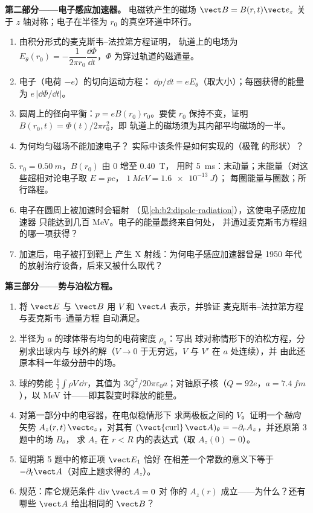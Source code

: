 \begin{problem}
\medskip
\noindent\textbf{第二部分——电子感应加速器。}
电磁铁产生的磁场 $\vect B = B(r, t)\vect e_z$ 关于
$z$ 轴对称；电子在半径为 $r_0$ 的真空环道中环行。
\begin{enumerate}[resume]
  \item 由积分形式的麦克斯韦–法拉第方程证明，
        轨道上的电场为 $E_\theta(r_0) = -\dfrac1{2\pi r_0}
        \dfrac{\dd\Phi}{\dd t}$，$\Phi$ 为穿过轨道的磁通量。
  \item 电子（电荷 $-e$）的切向运动方程：
        $\dd p/\dd t = eE_\theta$（取大小）；每圈获得的能量为
        $e\,|\dd\Phi/\dd t|$。
  \item 圆周上的径向平衡：$p = eB(r_0)r_0$。要使 $r_0$
        保持不变，证明 $B(r_0, t) = \Phi(t)/2\pi r_0^2$，即
        轨道上的磁场须为其内部平均磁场的一半。
  \item 为何均匀磁场不能加速电子？
        实际中该条件是如何实现的（极靴
        的形状）？
  \item $r_0 = \qty{0.50}{m}$，$B(r_0)$ 由 $0$ 增至 \qty{0.40}{T}，
        用时 \qty{5}{ms}：末动量；末能量（对这些超相对论电子取 $E = pc$，
        $\qty{1}{MeV} = \qty{1.6e-13}{J}$）；
        每圈能量与圈数；所行路程。
  \item 电子在圆周上被加速时会辐射
        （见\cref{ch:b2:dipole-radiation}），这使电子感应加速器
        只能达到几百 MeV。电子的能量最终来自何处，
        并通过麦克斯韦方程组的哪一项获得？
  \item 加速后，电子被打到靶上
        产生 X 射线：为何电子感应加速器曾是
        1950 年代的放射治疗设备，后来又被什么取代？
\end{enumerate}

\medskip
\noindent\textbf{第三部分——势与泊松方程。}
\begin{enumerate}[resume]
  \item 将 $\vect E$ 与 $\vect B$ 用 $V$ 和 $\vect A$ 表示，并验证
        麦克斯韦–法拉第方程与麦克斯韦–通量方程
        自动满足。
  \item 半径为 $a$ 的球体带有均匀的电荷密度 $\rho_0$：写出
        球对称情形下的泊松方程，分别求出球内与
        球外的解（$V \to 0$ 于无穷远，$V$ 与 $V'$ 在 $a$ 处连续），并
        由此还原本科一年级分册中的场。
  \item 球的势能 $\tfrac12\int\rho V\,\dd\tau$，其值为
        $3Q^2/20\pi\varepsilon_0a$；对铀原子核（$Q = 92e$，$a =
        \qty{7.4}{fm}$），以 MeV 计——即其裂变时释放的能量。
  \item 对第一部分中的电容器，在电似稳情形下
        求两极板之间的 $V$。证明一个\emph{轴向}
        矢势 $A_z(r, t)\,\vect e_z$，对其有 $(\operatorname{\vect{curl}}
        \vect A)_\theta = -\partial_rA_z$，并还原第 3 题中的场 $B_\theta$，
        求 $A_z$ 在 $r < R$ 内的表达式（取 $A_z(0) = 0$）。
  \item 证明第 5 题中的修正项 $\vect E_1$ 恰好
        在相差一个常数的意义下等于 $-\partial_t\vect A$（对应上题求得的 $A_z$）。
  \item 规范：库仑规范条件 $\operatorname{div}\vect A = 0$ 对
        你的 $A_z(r)$ 成立——为什么？还有哪些 $\vect A$ 给出相同的 $\vect B$？
\end{enumerate}


\end{problem}
